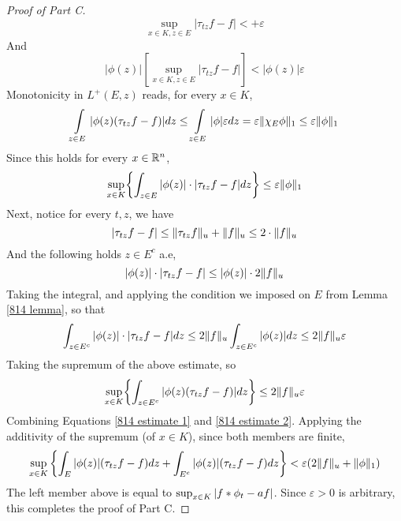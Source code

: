 \documentclass[../../main.tex]{subfiles}
\begin{document}
\begin{proof}[Proof of Part C]
        \[\sup_{x\in K,z\in E}\left|\tau_{tz}f-f\right|<+\varepsilon\]
        And
        \[|\phi(z)|\!\left[\sup_{x\in K,z\in E}|\tau_{tz}f-f|\right]<|\phi(z)|\varepsilon\]
        Monotonicity in $L^+(E,z)$ reads, for every $x\in K$,
        \[\int\limits_{z\in E}|\phi(z)(\tau_{tz}f-f)|dz\leq\int\limits_{z\in E}|\phi|\varepsilon dz=\varepsilon\lVert {\chi_E\phi} \rVert_1\leq\varepsilon\lVert {\phi} \rVert_1\]
        Since this holds for every $x\in\mathbb{R}^n$,
        \begin{equation}\label{814 estimate 1}
            \sup_{x\in K}\biggl\{\int_{z\in E}|\phi(z)|\cdot|\tau_{tz}f-f|dz\biggr\}\leq\varepsilon\lVert {\phi} \rVert_1
        \end{equation}
        Next, notice for every $t,z$, we have
        \[|\tau_{tz}f-f|\leq \lVert {\tau_{tz}f} \rVert_u + \lVert {f} \rVert_u\leq 2\cdot\lVert {f} \rVert_u\]
        And the following holds $z\in E^c$ a.e,
        \[|\phi(z)|\cdot|\tau_{tz}f-f|\leq|\phi(z)|\cdot2\lVert {f} \rVert_u\]
        Taking the integral, and applying the condition we imposed on $E$ from Lemma \eqref{814 lemma}, so that
        \[
            \int_{z\in E^c}|\phi(z)|\cdot|\tau_{tz}f-f|dz\leq2\lVert {f} \rVert_u\int_{z\in E^c}|\phi(z)|dz\leq 2\lVert {f} \rVert_u\varepsilon
        \]
        Taking the supremum of the above estimate, so
        \begin{equation}\label{814 estimate 2}
            \sup_{x\in K}\biggl\{\int_{z\in E^c}|\phi(z)(\tau_{tz}f-f)|dz\biggr\}\leq 2\lVert {f} \rVert_u\varepsilon
        \end{equation}
        Combining Equations \eqref{814 estimate 1} and \eqref{814 estimate 2}. Applying the additivity of the supremum (of $x\in K$), since both members are finite,
        \[\sup_{x\in K}\,\biggl\{\int_E|\phi(z)|(\tau_{tz}f-f)dz+\int_{E^c}|\phi(z)|(\tau_{tz}f-f)dz\biggr\}<\varepsilon(2\lVert {f} \rVert_u+\lVert {\phi} \rVert_1)
        \]
    The left member above is equal to $\sup_{x\in K}|f\ast \phi_t - af|$. Since $\varepsilon>0$ is arbitrary, this completes the proof of Part C.
\end{proof}
\end{document}
